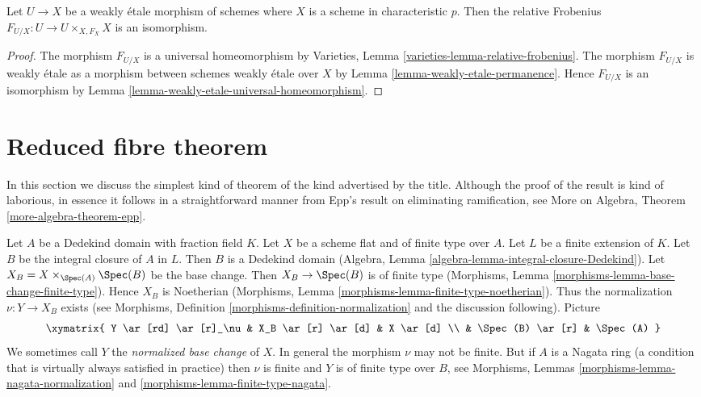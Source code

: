 \begin{lemma}
\label{lemma-relative-frobenius-weakly-etale}
Let $U \to X$ be a weakly \'etale morphism of schemes where $X$ is a scheme
in characteristic $p$. Then the relative Frobenius
$F_{U/X} : U \to U \times_{X, F_X} X$ is an isomorphism.
\end{lemma}

\begin{proof}
The morphism $F_{U/X}$ is a universal homeomorphism by
Varieties, Lemma \ref{varieties-lemma-relative-frobenius}.
The morphism $F_{U/X}$ is weakly \'etale as a morphism
between schemes weakly \'etale over $X$ by
Lemma \ref{lemma-weakly-etale-permanence}. Hence $F_{U/X}$
is an isomorphism by Lemma \ref{lemma-weakly-etale-universal-homeomorphism}.
\end{proof}






\section{Reduced fibre theorem}
\label{section-reduced-fibre-theorem}

\noindent
In this section we discuss the simplest kind of theorem of the kind
advertised by the title. Although the proof of the result is kind of
laborious, in essence it follows in a straightforward manner from
Epp's result on eliminating ramification, see
More on Algebra, Theorem \ref{more-algebra-theorem-epp}.

\medskip\noindent
Let $A$ be a Dedekind domain with fraction field $K$.
Let $X$ be a scheme flat and of finite type over $A$.
Let $L$ be a finite extension of $K$. Let $B$ be the integral
closure of $A$ in $L$. Then $B$ is a Dedekind domain
(Algebra, Lemma \ref{algebra-lemma-integral-closure-Dedekind}).
Let $X_B = X \times_{\Spec(A)} \Spec(B)$ be the base change.
Then $X_B \to \Spec(B)$ is of finite type
(Morphisms, Lemma \ref{morphisms-lemma-base-change-finite-type}).
Hence $X_B$ is Noetherian
(Morphisms, Lemma \ref{morphisms-lemma-finite-type-noetherian}).
Thus the normalization $\nu : Y \to X_B$ exists (see
Morphisms, Definition \ref{morphisms-definition-normalization}
and the discussion following). Picture
\begin{equation}
\label{equation-normalized-base-change}
\xymatrix{
Y \ar[rd] \ar[r]_\nu & X_B \ar[r] \ar[d] & X \ar[d] \\
 & \Spec(B) \ar[r] & \Spec(A)
}
\end{equation}
We sometimes call $Y$ the {\it normalized base change} of $X$.
In general the morphism $\nu$ may not be finite. But if $A$ is
a Nagata ring (a condition that is virtually always satisfied in
practice) then $\nu$ is finite and $Y$ is of finite type over $B$, see
Morphisms, Lemmas \ref{morphisms-lemma-nagata-normalization} and
\ref{morphisms-lemma-finite-type-nagata}.

